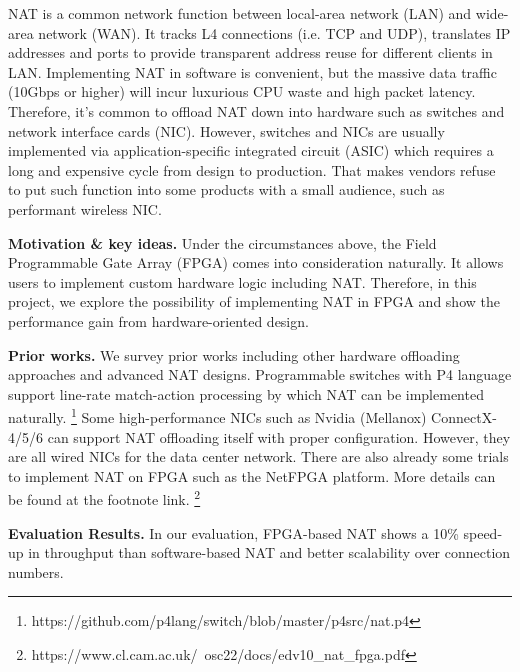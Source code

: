 





NAT is a common network function between local-area network (LAN) and wide-area
network (WAN). 
It tracks L4 connections (i.e. TCP and UDP), translates IP addresses and ports to 
provide transparent address reuse for different clients in LAN.
Implementing NAT in software is convenient, but the massive data traffic (10Gbps or higher) will incur luxurious CPU waste and high packet latency. Therefore, it's common to offload NAT down into hardware such as switches and network interface cards (NIC). 
However, switches and NICs are usually implemented via application-specific integrated circuit (ASIC) which requires a long and expensive cycle from design to production. That makes vendors refuse to put such function into some products with a small audience, such as performant wireless NIC. 



\textbf{Motivation \& key ideas.} 
Under the circumstances above, the Field Programmable Gate Array (FPGA) comes into consideration naturally. 
It allows users to implement custom hardware logic including NAT. Therefore, in this project, we explore the possibility of implementing NAT in FPGA and show the performance gain from hardware-oriented design. 

\textbf{Prior works.} We survey prior works including other hardware offloading approaches and advanced NAT designs. Programmable switches with P4 language support line-rate match-action processing by which NAT can be implemented naturally. 
\footnote{https://github.com/p4lang/switch/blob/master/p4src/nat.p4}
Some high-performance NICs such as Nvidia (Mellanox) ConnectX-4/5/6 can support NAT offloading itself with proper configuration. However, they are all wired NICs for the data center network.
There are also already some trials to implement NAT on FPGA such as the NetFPGA platform. More details can be found at the footnote link.
\footnote{https://www.cl.cam.ac.uk/~osc22/docs/edv10\_nat\_fpga.pdf}

\textbf{Evaluation Results.} In our evaluation, FPGA-based NAT shows a 10\% speed-up in throughput than software-based NAT and better scalability over connection numbers.


